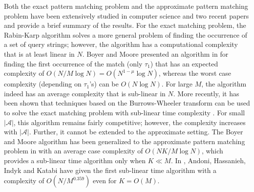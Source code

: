 Both the exact pattern matching problem and the approximate pattern matching problem have been extensively studied in computer science and two recent papers \cite{andoni2013shift} and \cite{amir2004faster} provide a brief summary of the results. For the exact matching problem, the Rabin-Karp algorithm solves a more general problem of finding the occurrence of a set of query strings; however, the algorithm has a computational complexity that is at least linear in $N$. Boyer and Moore presented an algorithm in \cite{boyer1977fast} for finding the first occurrence of the match (only $\tau_1$) that has an expected complexity of $O(N/M \log N) = O(N^{1-\mu} \log N)$, whereas the worst case complexity (depending on $\tau_1$'s) can be $O(N \log N)$. For large $M$, the algorithm indeed has an average complexity that is sub-linear in $N$. More recently, it has been shown that techniques based on the Burrows-Wheeler transform can be used to solve the exact matching problem with sub-linear time complexity \cite{}. For small $|\mathcal{A}|$, this algorithm remains fairly competitive; however, the complexity increases with $|\mathcal{A}|$. Further, it cannot be extended to the approximate setting. The Boyer and Moore algorithm has been generalized to the approximate pattern matching problem in \cite{chang1994approximate} with an average case complexity of $O(NK/M \log N)$, which provides a sub-linear time algorithm only when $K \ll M$. In \cite{andoni2013shift}, Andoni, Hassanieh, Indyk and Katabi have given the first sub-linear time algorithm with a complexity of $O(N/M^{0.359})$ even for $K = O(M)$.

